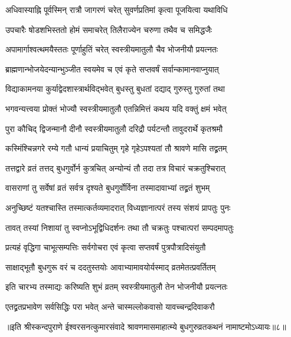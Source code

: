 \twolineshloka
{अधिवास्याह्नि पूर्वस्मिन् रात्रौ जागरणं चरेत्}
{सुवर्णप्रतिमां कृत्वा पूजयित्वा यथाविधि} %

\twolineshloka
{उपचारैः षोडशभिस्ततो होमं समाचरेत्}
{तिलैराज्येन चरुणा तथैव च समिद्धजैः} %

\twolineshloka
{अपामार्गाश्वत्थमयैस्ततः पूर्णाहुतिं चरेत्}
{स्वस्त्रीयमातुलौ चैव भोजनीयौ प्रयत्नतः} %

\twolineshloka
{ब्राह्मणान्भोजयेदन्यान्भुञ्जीत स्वयमेव च}
{एवं कृते सप्तवर्षं सर्वान्कामानवाप्नुयात्} %

\twolineshloka
{विद्याकामनया कुर्याद्वेदशास्त्रार्थविद्भवेत्}
{बुधस्तु बुधतां दद्याद् गुरुस्तु गुरुतां तथा} %


\twolineshloka
{भगवन्यत्त्वया प्रोक्तं भोज्यौ स्वस्त्रीयमातुलौ}
{एतन्निमित्तं कथय यदि वक्तुं क्षमं भवेत्} %


\twolineshloka
{पुरा कौचिद् द्विजन्मानौ दीनौ स्वस्त्रीयमातुलौ}
{दरिद्रौ पर्यटन्तौ तावुदरार्थे कृतश्रमौ} %

\twolineshloka
{कस्मिंश्चिन्नगरे रम्ये गतौ धान्यं प्रयाचितुम्}
{गृहे गृहेऽपश्यतां तौ श्रावणे मासि तद्व्रतम्} %

\twolineshloka
{तत्तद्वारे व्रतं तत्तद् बुधगुर्वोर्न कुत्रचित्}
{अन्योन्यं तौ तदा तत्र विचारं चक्रतुश्चिरात्} %

\twolineshloka
{वासराणां तु सर्वेषां व्रतं सर्वत्र दृश्यते}
{बुधगुर्वोर्विना तस्मादावाभ्यां तद्व्रतं शुभम्} %

\twolineshloka
{अनुच्छिष्टं यतश्चास्ति तस्मात्कर्तव्यमादरात्}
{विध्यज्ञानात्परं तस्य संशयं प्रापतुः पुनः} %

\twolineshloka
{तावत् तस्यां निशायां तु स्वप्नोऽभूद्विधिदर्शनः}
{तथा तौ चक्रतुः पश्चात्परां सम्पदमापतुः} %

\twolineshloka
{प्रत्यहं वृद्धिगा चाभूत्सम्पत्तिः सर्वगोचरा}
{एवं कृत्वा सप्तवर्षं पुत्रपौत्रादिसंयुतौ} %

\twolineshloka
{साक्षाद्भूतौ बुधगुरू वरं च ददतुस्तयोः}
{आवाभ्यामावयोर्यस्माद् व्रतमेतत्प्रवर्तितम्} %

\twolineshloka
{इति चारभ्य तस्माद्यः करिष्यति शुभं व्रतम्}
{स्वस्त्रीयमातुलौ तेन भोजनीयौ प्रयत्नतः} %

\twolineshloka
{एतद्व्रतप्रभावेण सर्वसिद्धिः परा भवेत्}
{अन्ते चास्मल्लोकवासो यावच्चन्द्रदिवाकरौ} %


{॥इति श्रीस्कन्दपुराणे ईश्वरसनत्कुमारसंवादे श्रावणमासमाहात्म्ये बुधगुरुव्रतकथनं नामाष्टमोऽध्यायः॥८॥}



